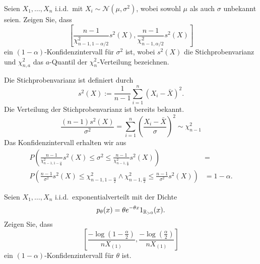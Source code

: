  Seien $X_1,\ldots,X_n$ i.i.d.\ mit 
$X_i\sim \mathcal N(\mu,\sigma^2)$, wobei sowohl $\mu$ als auch $\sigma$ unbekannt seien.
Zeigen Sie, dass
\begin{equation*}
    \left[ \frac{n-1}{\chi^2_{n-1,1-\alpha/2}}s^2(X), \frac{n-1}{\chi^2_{n-1,\alpha/2}}s^2(X) \right]
\end{equation*}
ein $\left( 1-\alpha \right)$-Konfidenzintervall für $\sigma^2$ ist, wobei
$s^2(X)$ die Stichprobenvarianz und $\chi^2_{n,a}$ das $a$-Quantil der $\chi^2_n$-Verteilung bezeichnen.

\solution
Die Stichprobenvarianz ist definiert durch
\begin{equation*}
    s^2(X) := \frac{1}{n-1} \sum_{i=1}^{n} (X_i - \bar X)^2.
\end{equation*}
Die Verteilung der Stichprobenvarianz ist bereits bekannt.
\begin{equation*}
    \frac{(n-1) s^2(X)}{\sigma^2} = \sum_{i=1}^{n} \left( \frac{ X_i -\bar X}{\sigma} \right)^2
    \sim \chi^2_{n-1}
\end{equation*}
Das Konfidenzintervall erhalten wir aus
\begin{align*}
    P \left( \frac{n-1}{\chi^2_{n-1,1-\frac{\alpha}{2}} } s^2(X) 
    \leq \sigma^2 \leq 
    \frac{n-1}{ \chi^2_{n-1,\frac{\alpha}{2}} } s^2(X)
    \right) &= \\
    P \left( \frac{n-1}{\sigma^2} s^{2}(X) \leq \chi^2_{n-1,1-\frac{\alpha}{2}} \wedge
    \chi^2_{n-1,\frac{\alpha}{2}} \leq \frac{n-1}{\sigma^2} s^2(X)
    \right) &= 1-\alpha.
\end{align*}








Seien $X_1,\ldots,X_n$ i.i.d.\ exponentialverteilt mit der Dichte
\begin{equation*}
    p_\theta(x) = \theta e^{- \theta x} 1_{ \mathbb R_{>0} }(x).
\end{equation*}
Zeigen Sie, dass 
\begin{equation*}
    \left[  \frac{- \log \left( 1 - \frac{\alpha}{2} \right)}{n X_{(1)}}, 
    \frac{- \log \left( \frac{\alpha}{2} \right)}{n X_{(1)}} \right]
\end{equation*}
ein $(1-\alpha)$-Konfidenzintervall für $\theta$ ist.

